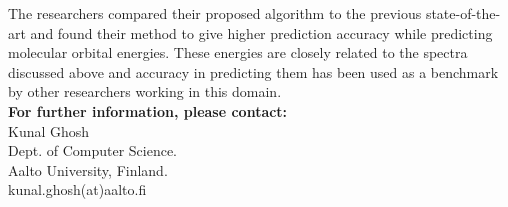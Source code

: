 \documentclass[a4paper]{article}
\begin{document}

The researchers compared their proposed algorithm to the previous state-of-the-art and found their method to give higher prediction accuracy while predicting molecular orbital energies. These energies are closely related to the spectra discussed above and accuracy in predicting them has been used as a benchmark by other researchers working in this domain.\\







 



\noindent \textbf{For further information, please contact:}\\

\noindent Kunal Ghosh\\
Dept. of Computer Science.\\
Aalto University, Finland.\\
kunal.ghosh(at)aalto.fi\\
\end{document}
